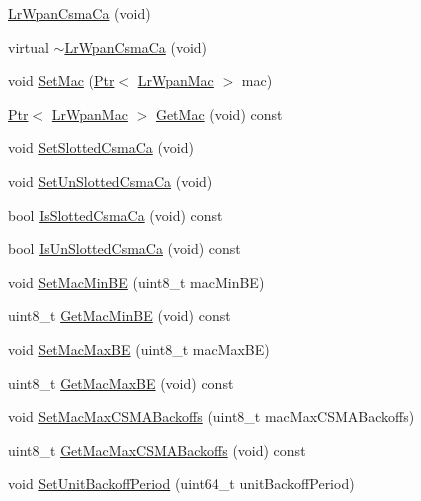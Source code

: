 \begin{DoxyCompactItemize}
\item 
\hyperlink{classns3_1_1LrWpanCsmaCa_a46b65f72ae88b1a472f4f07a463dcc73}{Lr\+Wpan\+Csma\+Ca} (void)
\item 
virtual \hyperlink{classns3_1_1LrWpanCsmaCa_aacb9ec4b46115ff1208f289dae6f94f1}{$\sim$\+Lr\+Wpan\+Csma\+Ca} (void)
\item 
void \hyperlink{classns3_1_1LrWpanCsmaCa_a4da31af952851fcac01ef1f11f33cf00}{Set\+Mac} (\hyperlink{classns3_1_1Ptr}{Ptr}$<$ \hyperlink{classns3_1_1LrWpanMac}{Lr\+Wpan\+Mac} $>$ mac)
\item 
\hyperlink{classns3_1_1Ptr}{Ptr}$<$ \hyperlink{classns3_1_1LrWpanMac}{Lr\+Wpan\+Mac} $>$ \hyperlink{classns3_1_1LrWpanCsmaCa_a9ac1fcb00a940fce7e5044620abd1e77}{Get\+Mac} (void) const 
\item 
void \hyperlink{classns3_1_1LrWpanCsmaCa_ace4f3df932b9698199c03016279f50ac}{Set\+Slotted\+Csma\+Ca} (void)
\item 
void \hyperlink{classns3_1_1LrWpanCsmaCa_a53885402a381f3c0e17501d538185560}{Set\+Un\+Slotted\+Csma\+Ca} (void)
\item 
bool \hyperlink{classns3_1_1LrWpanCsmaCa_accda524ef6c8f9ab6c54aff18e78c17a}{Is\+Slotted\+Csma\+Ca} (void) const 
\item 
bool \hyperlink{classns3_1_1LrWpanCsmaCa_a68821debbc93931d4c074041809a81cb}{Is\+Un\+Slotted\+Csma\+Ca} (void) const 
\item 
void \hyperlink{classns3_1_1LrWpanCsmaCa_a86d6ceb70f7a8500d152f1bbd7d14583}{Set\+Mac\+Min\+BE} (uint8\+\_\+t mac\+Min\+BE)
\item 
uint8\+\_\+t \hyperlink{classns3_1_1LrWpanCsmaCa_a5ed04a5a3d93b7394dca7b4d0e06b237}{Get\+Mac\+Min\+BE} (void) const 
\item 
void \hyperlink{classns3_1_1LrWpanCsmaCa_a7e57cbe21ea04c94e7ec8ad48b5b97e1}{Set\+Mac\+Max\+BE} (uint8\+\_\+t mac\+Max\+BE)
\item 
uint8\+\_\+t \hyperlink{classns3_1_1LrWpanCsmaCa_aa48c334c2762aa09441a87eb4fe52ee2}{Get\+Mac\+Max\+BE} (void) const 
\item 
void \hyperlink{classns3_1_1LrWpanCsmaCa_af175588287ae711db0fd119d6f059507}{Set\+Mac\+Max\+C\+S\+M\+A\+Backoffs} (uint8\+\_\+t mac\+Max\+C\+S\+M\+A\+Backoffs)
\item 
uint8\+\_\+t \hyperlink{classns3_1_1LrWpanCsmaCa_ae4d4946c6b29b2c8ba6b88374ee2d147}{Get\+Mac\+Max\+C\+S\+M\+A\+Backoffs} (void) const 
\item 
void \hyperlink{classns3_1_1LrWpanCsmaCa_a9d077e12d7c97d7b33d0b8ec1b3e79ad}{Set\+Unit\+Backoff\+Period} (uint64\+\_\+t unit\+Backoff\+Period)

\end{DoxyCompactItemize}

